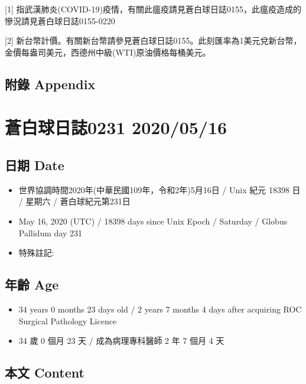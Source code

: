 \documentclass[
]{article}
\providecommand{\tightlist}{%
  \setlength{\itemsep}{0pt}\setlength{\parskip}{0pt}}
\begin{document}
{[}1{]}
指武漢肺炎(COVID-19)疫情，有關此瘟疫請見蒼白球日誌0155，此瘟疫造成的慘況請見蒼白球日誌0155-0220

{[}2{]}
新台幣計價。有關新台幣請參見蒼白球日誌0155。此刻匯率為1美元兌新台幣，金價每盎司美元，西德州中級(WTI)原油價格每桶美元。

\hypertarget{ux9644ux9304-appendix-14}{%
\subsection{附錄 Appendix}\label{ux9644ux9304-appendix-14}}

\hypertarget{ux84bcux767dux7403ux65e5ux8a8c0231-20200516}{%
\section{蒼白球日誌0231
2020/05/16}\label{ux84bcux767dux7403ux65e5ux8a8c0231-20200516}}

\hypertarget{ux65e5ux671f-date-15}{%
\subsection{日期 Date}\label{ux65e5ux671f-date-15}}

\begin{itemize}
\tightlist
\item
  世界協調時間2020年(中華民國109年，令和2年)5月16日 / Unix 紀元 18398 日
  / 星期六 / 蒼白球紀元第231日
\item
  May 16, 2020 (UTC) / 18398 days since Unix Epoch / Saturday / Globus
  Pallidum day 231
\item
  特殊註記:
\end{itemize}

\hypertarget{ux5e74ux9f61-age-15}{%
\subsection{年齡 Age}\label{ux5e74ux9f61-age-15}}

\begin{itemize}
\tightlist
\item
  34 years 0 months 23 days old / 2 years 7 months 4 days after
  acquiring ROC Surgical Pathology Licence
\item
  34 歲 0 個月 23 天 / 成為病理專科醫師 2 年 7 個月 4 天
\end{itemize}

\hypertarget{ux672cux6587-content-15}{%
\subsection{本文 Content}\label{ux672cux6587-content-15}}
\end{document}
